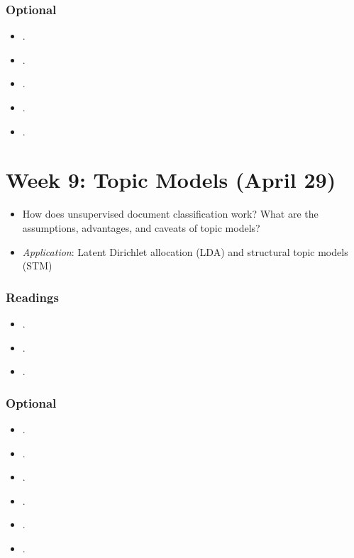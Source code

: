 \documentclass[abstract=on,parskip=full,headings=standardclasses,fontsize=11pt,paper=a4]{scrartcl}
\begin{document}
\subsubsection*{Optional}
\begin{itemize}
\item {}.
\item {}.
\item {}.
\item {}.
\item {}.
\end{itemize}


\section{Week 9: Topic Models (April 29)}

\begin{itemize}
\renewcommand\labelitemi{--}
\item How does unsupervised document classification work? What are the assumptions, advantages, and caveats of topic models? 
\item \textit{Application}: Latent Dirichlet allocation (LDA) and structural topic models (STM)
\end{itemize}

\subsubsection*{Readings}
\begin{itemize}
\item {}.
\item {}.
\item {}.
\end{itemize}


\subsubsection*{Optional}
\begin{itemize}
\item {}.
\item {}.
\item {}.
\item {}.
\item {}.
\item {}.
\end{itemize}
\end{document}
